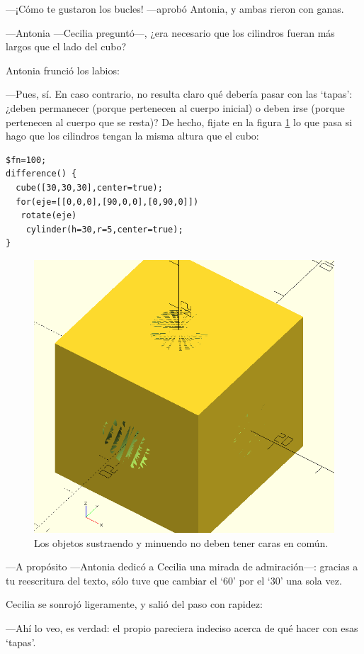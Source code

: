 ---¡Cómo te gustaron los bucles! ---aprobó Antonia, y ambas rieron con ganas.

---Antonia ---Cecilia preguntó---, ¿era necesario que los cilindros
fueran más largos que el lado del cubo?

  Antonia frunció los labios:

  ---Pues, sí. En caso contrario, no resulta claro qué debería pasar
  con las `tapas': ¿deben permanecer (porque pertenecen al cuerpo
  inicial) o deben irse (porque pertenecen al cuerpo que se resta)? De
  hecho, fijate en la figura \ref{fig:diferencia-rara} lo que pasa si
  hago que los cilindros tengan la misma altura que el cubo:


    \begin{lstlisting}
$fn=100;
difference() {
  cube([30,30,30],center=true);
  for(eje=[[0,0,0],[90,0,0],[0,90,0]])
   rotate(eje)
    cylinder(h=30,r=5,center=true);
}
    \end{lstlisting}%

    
    \begin{figure}[ht]
      \centering
      \includegraphics[width=.5\textwidth]{imagenes/diferencia-rara}      
      \caption{Los objetos sustraendo y minuendo no deben tener caras en común.}
      \label{fig:diferencia-rara}
    \end{figure}


    ---A propósito ---Antonia dedicó a Cecilia una mirada de
    ad\-mi\-ra\-ción---: gracias a tu reescritura del texto, sólo tuve
    que cambiar el `60' por el `30' una sola vez.

    Cecilia se sonrojó ligeramente, y salió del paso con rapidez:
    
    ---Ahí lo veo, es verdad: el propio \openscad{} pareciera indeciso
    acerca de qué hacer con esas `tapas'.

